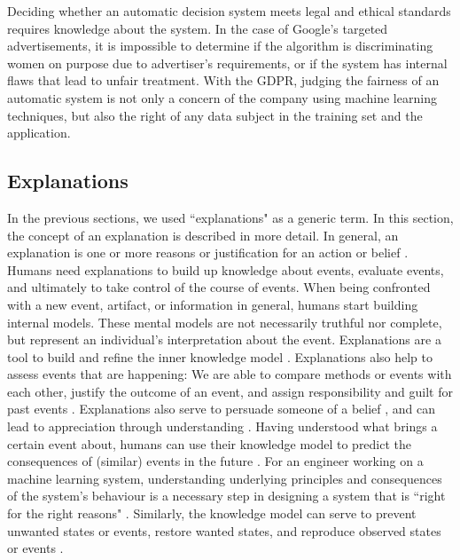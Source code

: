 Deciding whether an automatic decision system meets legal and ethical standards requires knowledge about the system. In the case of Google's targeted advertisements, it is impossible to determine if the algorithm is discriminating women on purpose due to advertiser's requirements, or if the system has internal flaws that lead to unfair treatment. With the GDPR, judging the fairness of an automatic system is not only a concern of the company using machine learning techniques, but also the right of any data subject in the training set and the application. 



\subsection{Explanations}
In the previous sections, we used ``explanations" as a generic term. In this section, the concept of an explanation is described in more detail.\newline
In general, an explanation is one or more reasons or justification for an action or belief \cite{preece2018asking}. Humans need explanations to build up knowledge about events, evaluate events, and ultimately to take control of the course of events.\newline
When being confronted with a new event, artifact, or information in general, humans start building internal models. These mental models are not necessarily truthful nor complete, but represent an individual's interpretation about the event. Explanations are a tool to build and refine the inner knowledge model \cite{miller2017explanation}.\newline
Explanations also help to assess events that are happening: We are able to compare methods or events with each other, justify the outcome of an event, and assign responsibility and guilt for past events \cite{keil2006explanation, miller2017explanation}. Explanations also serve to persuade someone of a belief \cite{miller2017explanation}, and can lead to appreciation through understanding \cite{keil2006explanation}.\newline
Having understood what brings a certain event about, humans can use their knowledge model to predict the consequences of (similar) events in the future \cite{miller2017explanation}. For an engineer working on a machine learning system, understanding underlying principles and consequences of the system's behaviour is a necessary step in designing a system that is ``right for the right reasons" \cite{preece2018asking}. Similarly, the knowledge model can serve to prevent unwanted states or events, restore wanted states, and reproduce observed states or events \cite{keil2006explanation}.



